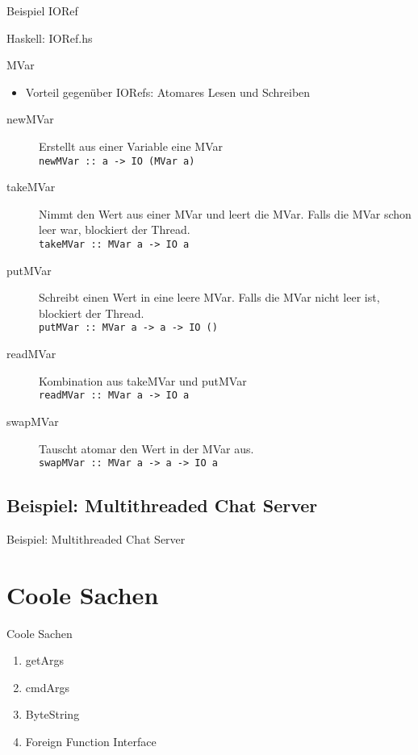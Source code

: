 \documentclass{beamer}
\newcommand{\code}[2]
{
	\begin{block}{#1: #2}
	
	\end{block}
}
\begin{document}
\begin{frame}[fragile]{Beispiel IORef}
\tiny
\code{Haskell}{IORef.hs}
\end{frame}

\begin{frame}[<+->]{MVar}
\begin{itemize}
\item Vorteil gegenüber IORefs: Atomares Lesen und Schreiben
\end{itemize}
\begin{description}
\item[newMVar] Erstellt aus einer Variable eine MVar \\ \texttt{newMVar :: a -> IO (MVar a)}
\item[takeMVar] Nimmt den Wert aus einer MVar und leert die MVar. Falls die MVar schon leer war, blockiert der Thread. \\ \texttt{takeMVar :: MVar a -> IO a}
\item[putMVar] Schreibt einen Wert in eine leere MVar. Falls die MVar nicht leer ist, blockiert der Thread. \\
\texttt{putMVar :: MVar a -> a -> IO ()}
\item[readMVar] Kombination aus takeMVar und putMVar \\ \texttt{readMVar :: MVar a -> IO a}
\item[swapMVar] Tauscht atomar den Wert in der MVar aus. \\ \texttt{swapMVar :: MVar a -> a -> IO a}
\end{description}
\end{frame}

\subsection{Beispiel: Multithreaded Chat Server}
\begin{frame}{Beispiel: Multithreaded Chat Server}
\end{frame}

\section{Coole Sachen}
\begin{frame}{Coole Sachen}
\begin{enumerate}
\item getArgs
\item cmdArgs
\item ByteString
\item Foreign Function Interface
\end{enumerate}
\end{frame}
\end{document}

